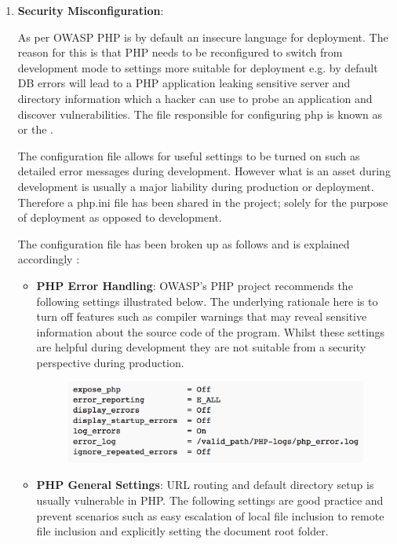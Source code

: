 \begin{enumerate}
    \item \textbf{Security Misconfiguration}:
    
    As per OWASP \cite{OWASPa} PHP is by default an insecure language for deployment. The reason for this is that PHP needs to be reconfigured to switch from development mode to settings more suitable for deployment e.g. by default DB errors will lead to a PHP application leaking sensitive server and directory information which a hacker can use to probe an application and discover vulnerabilities. The file responsible for configuring php is known as  or the \cite{PHPa}.
    
    The configuration file allows for useful settings to be turned on such as detailed error messages during development. However what is an asset during development is usually a major liability during production or deployment. Therefore a php.ini file has been shared in the project; solely for the purpose of deployment as opposed to development.
    
    The configuration file has been broken up as follows and is explained accordingly \cite{OWASPa}:
    \begin{itemize}
        \item \textbf{PHP Error Handling}\cite{OWASPb}: OWASP's PHP project recommends the following settings  illustrated below. The underlying rationale here is to turn off features such as compiler warnings that may reveal sensitive information about the source code of the program. Whilst these settings are helpful during development they are not suitable from a security perspective during production.
            \begin{figure}[H]
            	\centering
            	\includegraphics[scale=0.44,center]{chapters/chapter03/figures/errorPHP.png}
            	\label{PHPError}
            \end{figure}   

        \item \textbf{PHP General Settings}\cite{OWASPb}: URL routing and default directory setup is usually vulnerable in PHP. The following settings are good practice and prevent scenarios such as easy escalation of local file inclusion to remote file inclusion and explicitly setting the document root folder.
        

\end{itemize}
\end{enumerate}
